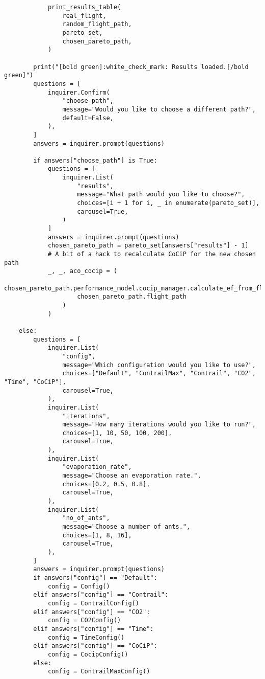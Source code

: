 \begin{verbatim}
            print_results_table(
                real_flight,
                random_flight_path,
                pareto_set,
                chosen_pareto_path,
            )

        print("[bold green]:white_check_mark: Results loaded.[/bold green]")
        questions = [
            inquirer.Confirm(
                "choose_path",
                message="Would you like to choose a different path?",
                default=False,
            ),
        ]
        answers = inquirer.prompt(questions)

        if answers["choose_path"] is True:
            questions = [
                inquirer.List(
                    "results",
                    message="What path would you like to choose?",
                    choices=[i + 1 for i, _ in enumerate(pareto_set)],
                    carousel=True,
                )
            ]
            answers = inquirer.prompt(questions)
            chosen_pareto_path = pareto_set[answers["results"] - 1]
            # A bit of a hack to recalculate CoCiP for the new chosen path
            _, _, aco_cocip = (
                chosen_pareto_path.performance_model.cocip_manager.calculate_ef_from_flight_path(
                    chosen_pareto_path.flight_path
                )
            )

    else:
        questions = [
            inquirer.List(
                "config",
                message="Which configuration would you like to use?",
                choices=["Default", "ContrailMax", "Contrail", "CO2", "Time", "CoCiP"],
                carousel=True,
            ),
            inquirer.List(
                "iterations",
                message="How many iterations would you like to run?",
                choices=[1, 10, 50, 100, 200],
                carousel=True,
            ),
            inquirer.List(
                "evaporation_rate",
                message="Choose an evaporation rate.",
                choices=[0.2, 0.5, 0.8],
                carousel=True,
            ),
            inquirer.List(
                "no_of_ants",
                message="Choose a number of ants.",
                choices=[1, 8, 16],
                carousel=True,
            ),
        ]
        answers = inquirer.prompt(questions)
        if answers["config"] == "Default":
            config = Config()
        elif answers["config"] == "Contrail":
            config = ContrailConfig()
        elif answers["config"] == "CO2":
            config = CO2Config()
        elif answers["config"] == "Time":
            config = TimeConfig()
        elif answers["config"] == "CoCiP":
            config = CocipConfig()
        else:
            config = ContrailMaxConfig()


\end{verbatim}
